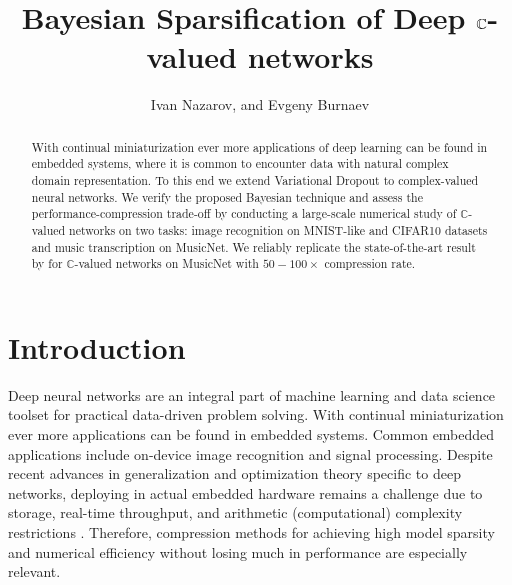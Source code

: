 \documentclass[a4paper,10pt]{article}
\title{Bayesian Sparsification of Deep $\cplx$-valued networks}
\author{Ivan Nazarov, and Evgeny Burnaev}
\newcommand{\cplx}{\mathbb{C}}
\begin{document}
\maketitle

\begin{abstract}
With continual miniaturization ever more applications of deep learning can be found
in embedded systems, where it is common to encounter data with natural complex domain
representation. To this end we extend Variational Dropout to complex-valued neural
networks. We verify the proposed Bayesian technique and assess the performance-compression
trade-off by conducting a large-scale numerical study of $\cplx$-valued networks on
two tasks: image recognition on MNIST-like and CIFAR10 datasets and music transcription
on MusicNet. We reliably replicate the state-of-the-art result by \citet{trabelsi_deep_2017}
for $\cplx$-valued networks on MusicNet with $50-100\times$ compression rate.
\end{abstract}

\section{Introduction} %
\label{sec:introduction}

Deep neural networks are an integral part of machine learning and data science toolset
for practical data-driven problem solving. With continual miniaturization ever more
applications can be found in embedded systems. Common embedded applications include
on-device image recognition and signal processing. Despite recent advances in generalization
and optimization theory specific to deep networks, deploying in actual embedded hardware
remains a challenge due to storage, real-time throughput, and arithmetic (computational)
complexity restrictions \citep{he_amc:_2018}. Therefore, compression methods for achieving
high model sparsity and numerical efficiency without losing much in performance are
especially relevant.
\end{document}
